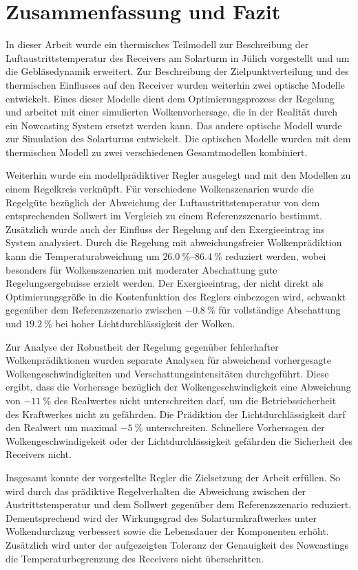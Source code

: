 \chapter{Zusammenfassung und Fazit} \label{ch_Fazit}
In dieser Arbeit wurde ein thermisches Teilmodell zur Beschreibung der Luftaustrittstemperatur des Receivers am Solarturm in Jülich vorgestellt und um die Gebläsedynamik erweitert.
Zur Beschreibung der Zielpunktverteilung und des thermischen Einflusses auf den Receiver wurden weiterhin zwei optische Modelle entwickelt.
Eines dieser Modelle dient dem Optimierungsprozess der Regelung und arbeitet mit einer simulierten Wolkenvorhersage, die in der Realität durch ein Nowcasting System ersetzt werden kann.
Das andere optische Modell wurde zur Simulation des Solarturms entwickelt.
Die optischen Modelle wurden mit dem thermischen Modell zu zwei verschiedenen Gesamtmodellen kombiniert.

Weiterhin wurde ein modellprädiktiver Regler ausgelegt und mit den Modellen zu einem Regelkreis verknüpft.
Für verschiedene Wolkenszenarien wurde die Regelgüte bezüglich der Abweichung der Luftaustrittstemperatur von dem entsprechenden Sollwert im Vergleich zu einem Referenzszenario bestimmt.
Zusätzlich wurde auch der Einfluss der Regelung auf den Exergieeintrag ins System analysiert.
Durch die Regelung mit abweichungsfreier Wolkenprädiktion kann die Temperaturabweichung um $\SIrange{26.0}{86.4}{\percent}$ reduziert werden, wobei besonders für Wolkenszenarien mit moderater Abschattung gute Regelungsergebnisse erzielt werden.
Der Exergieeintrag, der nicht direkt als Optimierungsgröße in die Kostenfunktion des Reglers einbezogen wird, schwankt gegenüber dem Referenzszenario zwischen $\SI{-0.8}{\percent}$ für vollständige Abschattung und $\SI{19.2}{\percent}$ bei hoher Lichtdurchlässigkeit der Wolken.

Zur Analyse der Robustheit der Regelung gegenüber fehlerhafter Wolkenprädiktionen wurden separate Analysen für abweichend vorhergesagte Wolkengeschwindigkeiten und Verschattungsintensitäten durchgeführt.
Diese ergibt, dass die Vorhersage bezüglich der Wolkengeschwindigkeit eine Abweichung von $\SI{-11}{\percent}$ des Realwertes nicht unterschreiten darf, um die Betriebssicherheit des Kraftwerkes nicht zu gefährden.
Die Prädiktion der Lichtdurchlässigkeit darf den Realwert um maximal $\SI{-5}{\percent}$ unterschreiten.
Schnellere Vorhersagen der Wolkengeschwindigekeit oder der Lichtdurchlässigkeit gefährden die Sicherheit des Receivers nicht.

Insgesamt konnte der vorgestellte Regler die Zielsetzung der Arbeit erfüllen.
So wird durch das prädiktive Regelverhalten die Abweichung zwischen der Austrittstemperatur und dem Sollwert gegenüber dem Referenzszenario reduziert.
Dementsprechend wird der Wirkungsgrad des Solarturmkraftwerkes unter Wolkendurchzug verbessert sowie die Lebensdauer der Komponenten erhöht.
Zusätzlich wird unter der aufgezeigten Toleranz der Genauigkeit des Nowcastings die Temperaturbegrenzung des Receivers nicht überschritten.

